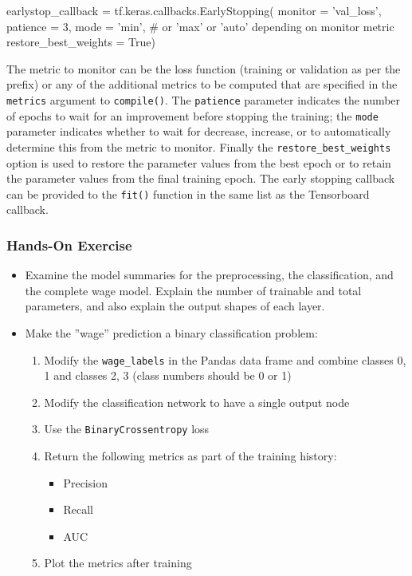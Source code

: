 \begin{samepage}
\begin{pythoncode}
earlystop_callback = tf.keras.callbacks.EarlyStopping(
    monitor = 'val_loss',
    patience = 3,
    mode = 'min', # or 'max' or 'auto' depending on monitor metric
    restore_best_weights = True)
\end{pythoncode}
\end{samepage}

The metric to monitor can be the loss function (training or validation as per the prefix) or any of the additional metrics to be computed that are specified in the \texttt{metrics} argument to \texttt{compile()}. The \texttt{patience} parameter indicates the number of epochs to wait for an improvement before stopping the training; the \texttt{mode} parameter indicates whether to wait for decrease, increase, or to automatically determine this from the metric to monitor. Finally the \texttt{restore\_best\_weights} option is used to restore the parameter values from the best epoch or to retain the parameter values from the final training epoch. The early stopping callback can be provided to the \texttt{fit()} function in the same list as the Tensorboard callback.


\begin{tcolorbox}[colback=code]
\subsubsection*{Hands-On Exercise} 
\begin{itemize}
   \item Examine the model summaries for the preprocessing, the classification, and the complete wage model. Explain the number of trainable and total parameters, and also explain the output shapes of each layer.
   \item Make the ''wage'' prediction a binary classification problem:
   \begin{enumerate}
      \item Modify the \texttt{wage\_labels} in the Pandas data frame and combine classes 0, 1 and classes 2, 3 (class numbers should be 0 or 1)
      \item Modify the classification network to have a single output node
      \item Use the \texttt{BinaryCrossentropy} loss
      \item Return the following metrics as part of the training history:
      \begin{itemize}
          \item Precision
          \item Recall
          \item AUC
      \end{itemize}
      \item Plot the metrics after training
   \end{enumerate}
\end{itemize}
\end{tcolorbox}


